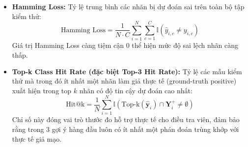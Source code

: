 \begin{itemize}[label={--}, itemsep=2pt]
    \item \textbf{Hamming Loss:} Tỷ lệ trung bình các nhãn bị dự đoán sai trên toàn bộ tập kiểm thử:
    \begin{equation}
    \text{Hamming Loss} = \frac{1}{N \cdot C} \sum_{i=1}^{N} \sum_{c=1}^{C} \mathbb{I}(\hat{y}_{i,c} \neq y_{i,c})
    \end{equation}
    Giá trị Hamming Loss càng tiệm cận 0 thể hiện mức độ sai lệch nhãn càng thấp.
    \item \textbf{Top-k Class Hit Rate (đặc biệt Top-3 Hit Rate):} Tỷ lệ các mẫu kiểm thử mà trong đó ít nhất một nhãn làm giả thực tế (ground-truth positive) xuất hiện trong top $k$ nhãn có độ tin cậy dự đoán cao nhất:
    \begin{equation}
    \text{Hit@k} = \frac{1}{N} \sum_{i=1}^{N} \mathbb{I} \left( \text{Top-k}(\hat{\mathbf{y}}_i) \cap \mathbf{Y}_i^+ \neq \emptyset \right)
    \end{equation}
    Chỉ số này đóng vai trò thước đo hỗ trợ thực tế cho điều tra viên, đảm bảo rằng trong 3 gợi ý hàng đầu luôn có ít nhất một phán đoán trùng khớp với thực tế giả mạo.
\end{itemize}
